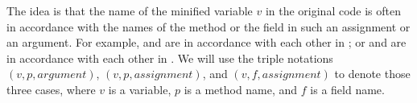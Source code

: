 The idea is that the name of the minified variable $v$ in the original
code is often in accordance with the names of the method or the field
in such an assignment or an argument. For example,  and
 are in accordance with each other in ; or  and
 are in accordance with each other in
.  We will use the
triple notations $(v, p, argument)$, $(v, p, assignment)$, and
$(v, f, assignment)$ to denote those three cases, where $v$ is a
variable, $p$ is a method name, and $f$ is a field name.







